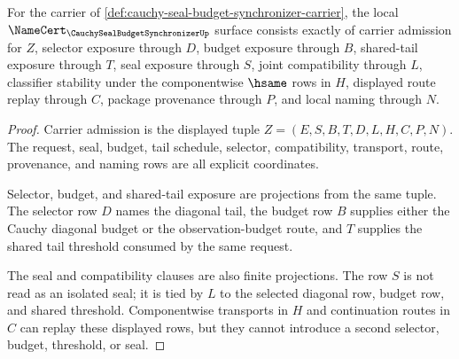 \begin{theorem}
\label{thm:cauchy-seal-budget-synchronizer-obligations}
For the carrier of \autoref{def:cauchy-seal-budget-synchronizer-carrier}, the local $\NameCert_{\CauchySealBudgetSynchronizerUp}$ surface consists exactly of carrier admission for $Z$, selector exposure through $D$, budget exposure through $B$, shared-tail exposure through $T$, seal exposure through $S$, joint compatibility through $L$, classifier stability under the componentwise $\hsame$ rows in $H$, displayed route replay through $C$, package provenance through $P$, and local naming through $N$.
\end{theorem}
\begin{proof}
Carrier admission is the displayed tuple $Z=(E,S,B,T,D,L,H,C,P,N)$. The request, seal, budget, tail schedule, selector, compatibility, transport, route, provenance, and naming rows are all explicit coordinates.

Selector, budget, and shared-tail exposure are projections from the same tuple. The selector row $D$ names the diagonal tail, the budget row $B$ supplies either the Cauchy diagonal budget or the observation-budget route, and $T$ supplies the shared tail threshold consumed by the same request.

The seal and compatibility clauses are also finite projections. The row $S$ is not read as an isolated seal; it is tied by $L$ to the selected diagonal row, budget row, and shared threshold. Componentwise transports in $H$ and continuation routes in $C$ can replay these displayed rows, but they cannot introduce a second selector, budget, threshold, or seal.
\end{proof}

